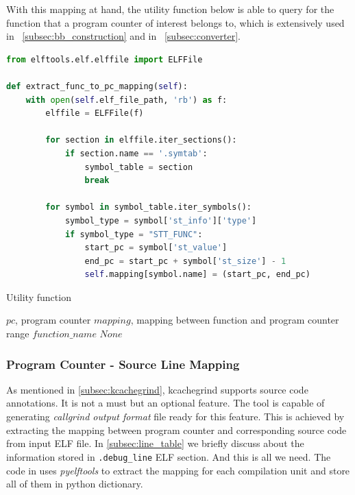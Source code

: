 With this mapping at hand, the utility function below is able to query for the function that a program counter of interest belongs to, which is extensively used in ~\ref{subsec:bb_construction} and in ~\ref{subsec:converter}.

\lstset{style=mystyle}

\begin{lstlisting}[language=Python, caption={Function that extracts static program - dynamic traces mapping}, label=code:func_pc_mapping]
from elftools.elf.elffile import ELFFile

def extract_func_to_pc_mapping(self):
    with open(self.elf_file_path, 'rb') as f:
        elffile = ELFFile(f)

        for section in elffile.iter_sections():
            if section.name == '.symtab':
                symbol_table = section
                break

        for symbol in symbol_table.iter_symbols():
            symbol_type = symbol['st_info']['type']
            if symbol_type = "STT_FUNC":
                start_pc = symbol['st_value']
                end_pc = start_pc + symbol['st_size'] - 1
                self.mapping[symbol.name] = (start_pc, end_pc)

\end{lstlisting}

\medskip
\begin{algorithm}
\caption{Utility function}
\begin{algorithmic}
\REQUIRE $pc$, program counter
\REQUIRE $mapping$, mapping between function and program counter range
        \RETURN $function\_name$
    \ELSE
        \RETURN $None$
    \ENDIF
\ENDFOR
\end{algorithmic}
\end{algorithm}
\medskip

\subsubsection{Program Counter - Source Line Mapping}

As mentioned in \ref{subsec:kcachegrind}, kcachegrind supports source code annotations. It is not a must but an optional feature. The tool is capable of generating \textit{callgrind output format} file ready for this feature. This is achieved by extracting the mapping between program counter and corresponding source code from input ELF file. In \ref{subsec:line_table} we briefly discuss about the information stored in \texttt{.debug\_line} ELF section. And this is all we need. The code in \label{code:debug_line_mapping} uses \textit{pyelftools} to extract the mapping for each compilation unit and store all of them in python dictionary.

